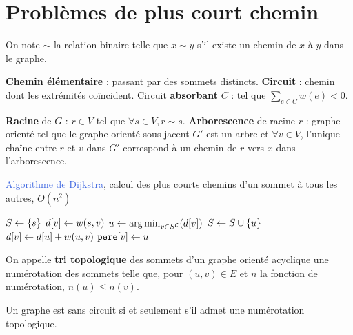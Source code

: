 \documentclass[a4paper,11pt,twocolumn]{article}
\begin{document}
\section{Problèmes de plus court chemin}

	\begin{note}
	On note $\sim$ la relation binaire telle que $x \sim y$ s'il existe un chemin de $x$ à $y$ dans le graphe.
	\end{note}

	\begin{defn}
	\textbf{Chemin élémentaire} : passant par des sommets distincts.
	\textbf{Circuit} : chemin dont les extrémités coïncident.
	Circuit \textbf{absorbant} $C$ : tel que $\sum_{e \in C} w(e) < 0$.
	\end{defn}

	\begin{defn}
	\textbf{Racine} de $G$ : $r \in V$ tel que $\forall s \in V, r \sim s$.
	\textbf{Arborescence} de racine $r$ : graphe orienté tel que le graphe orienté sous-jacent $G'$ est un arbre et $\forall v \in V$, l'unique chaîne entre $r$ et $v$ dans $G'$ correspond à un chemin de $r$ vers $x$ dans l’arborescence.
	\end{defn}


	\begin{algorithm}
	\caption{\textcolor{RoyalBlue}{Algorithme de Dijkstra}, calcul des plus courts chemins d'un sommet à tous les autres, $O(n^2)$}
	$S \leftarrow \{ s \}$\;
	{
		$d[v] \leftarrow w(s,v)$
	}
	{
		$u \leftarrow \operatorname{arg\, min}_{v \in {S}^{\mathcal{C}}}(d[v])$\;
		$S \leftarrow S \cup \{ u \}$\;
		{
			{
				$d[v] \leftarrow d[u] + w(u,v)$ \;
				$\texttt{pere}[v] \leftarrow u$ \;
			}
		}
	}
	\end{algorithm}

	\begin{defn}
	On appelle \textbf{tri topologique} des sommets d'un graphe orienté acyclique une numérotation des sommets telle que, pour $(u,v) \in E$ et $n$ la fonction de numérotation, $n(u) \leq n(v)$.
	\end{defn}

	\begin{pop}
	Un graphe est sans circuit si et seulement s'il admet une numérotation topologique.
	\end{pop}
\end{document}
